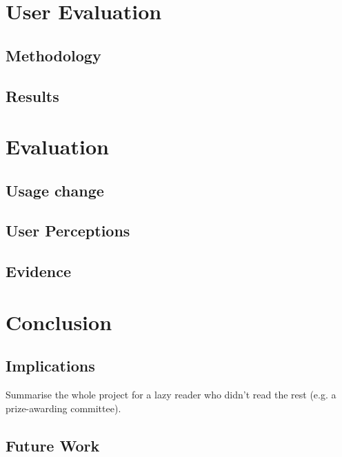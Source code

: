 \documentclass{l4proj}
\begin{document}

\chapter{User Evaluation}

\section{Methodology}

\section{Results}

\chapter{Evaluation} 

\section{Usage change}

\section{User Perceptions}

\section{Evidence}

\chapter{Conclusion}  
\section{Implications}
Summarise the whole project for a lazy reader who didn't read the rest (e.g. a prize-awarding committee).
\section{Future Work}
\end{document}
